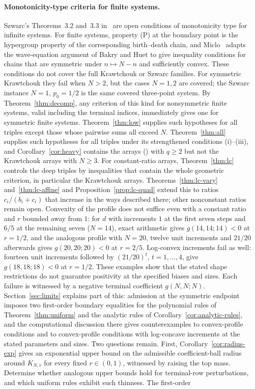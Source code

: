 \documentclass[twoside,10pt]{article}
\numberwithin{equation}{section}
\theoremstyle{slbody}
\theoremstyle{definition}
\theoremstyle{remark}
\renewcommand{\eqref}[1]{\textup{{\normalfont(\oldstylenums{\ref{#1}}}\normalfont)}}
\begin{document}
\paragraph{Monotonicity-type criteria for finite systems.}
Szwarc's Theorems~3.2 and~3.3 in~\cite{szwarc} are open conditions of monotonicity type for infinite systems. For finite systems, property (P) at the boundary point is the hypergroup property of the corresponding birth--death chain, and Miclo~\cite[Theorem~31 and Proposition~6]{miclo2015} adapts the wave-equation argument of Bakry and Huet to give inequality conditions for chains that are symmetric under $n\mapsto N-n$ and sufficiently convex. These conditions do not cover the full Krawtchouk or Szwarc families. For symmetric Krawtchouk they fail when $N>2$, but the cases $N=1,2$ are covered; the Szwarc instance $N=1$, $p_0=1/2$ is the same covered three-point system. By Theorem~\ref{thm:decomp}, any criterion of this kind for nonsymmetric finite systems, valid including the terminal indices, immediately gives one for symmetric finite systems. Theorem~\ref{thm:low} supplies such hypotheses for all triples except those whose pairwise sums all exceed $N$. Theorem~\ref{thm:all} supplies such hypotheses for all triples under its strengthened conditions (i)--(iii), and Corollary~\ref{cor:heavy} contains the arrays \eqref{eq:parameters} with $q\geq2$ but not the Krawtchouk arrays with $N\geq3$. For constant-ratio arrays, Theorem~\ref{thm:lc} controls the deep triples by inequalities that contain the whole geometric criterion, in particular the Krawtchouk arrays. Theorems~\ref{thm:lc-vary} and~\ref{thm:lc-affine} and Proposition~\ref{prop:lc-quad} extend this to ratios $c_i/(b_i+c_i)$ that increase in the ways described there; other nonconstant ratios remain open. Convexity of the profile does not suffice even with a constant ratio and $r$ bounded away from $1$: for $d$ with increments $1$ at the first seven steps and $6/5$ at the remaining seven ($N=14$), exact arithmetic gives $g(14,14;14)<0$ at $r=1/2$, and the analogous profile with $N=20$, twelve unit increments and $21/20$ afterwards gives $g(20,20;20)<0$ at $r=2/5$. Log-convex increments fail as well: fourteen unit increments followed by $(21/20)^t$, $t=1,\ldots,4$, give $g(18,18;18)<0$ at $r=1/2$. These examples show that the stated shape restrictions do not guarantee positivity at the specified biases and sizes. Each failure is witnessed by a negative terminal coefficient $g(N,N;N)$. Section~\ref{sec:limits} explains part of this: admission at the symmetric endpoint imposes two first-order boundary equalities for the polynomial rules of Theorem~\ref{thm:uniform} and the analytic rules of Corollary~\ref{cor:analytic-rules}, and the computational discussion there gives counterexamples to convex-profile conditions and to convex-profile conditions with log-concave increments at the stated parameters and sizes. Two questions remain. First, Corollary~\ref{cor:radius-exp} gives an exponential upper bound on the admissible coefficient-ball radius around $K_{N,r}$ for every fixed $r\in(0,1)$, witnessed by raising the top mass. Determine whether analogous upper bounds hold for terminal-row perturbations, and which uniform rules exhibit such thinness. The first-order 
\end{document}
